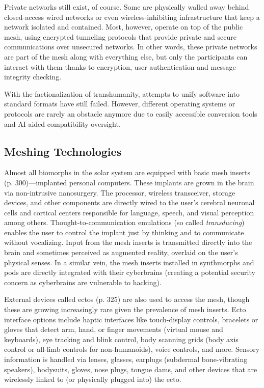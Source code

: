 Private networks still exist, of course. Some are 
physically walled away behind closed-access wired networks
or even wireless-inhibiting infrastructure that
keep a network isolated and contained. Most, however, 
operate on top of the public mesh, using encrypted 
tunneling protocols that provide private and secure 
communications over unsecured networks. In other 
words, these private networks are part of the mesh 
along with everything else, but only the participants 
can interact with them thanks to encryption, user authentication
and message integrity checking.

With the factionalization of transhumanity, attempts
to unify software into standard formats have
still failed. However, different operating systems 
or protocols are rarely an obstacle anymore due to 
easily accessible conversion tools and AI-aided compatibility
oversight.

\subsection{Meshing Technologies}

Almost all biomorphs in the solar system are equipped 
with basic mesh inserts (p. 300)—implanted personal 
computers. These implants are grown in the brain via 
non-intrusive nanosurgery. The processor, wireless 
transceiver, storage devices, and other components 
are directly wired to the user's cerebral neuronal cells 
and cortical centers responsible for language, speech, 
and visual perception among others. Thought-to-communication
emulations (so called \textit{transducing})
enables the user to control the implant just by thinking
and to communicate without vocalizing. Input
from the mesh inserts is transmitted directly into the 
brain and sometimes perceived as augmented reality, 
overlaid on the user's physical senses. In a similar 
vein, the mesh inserts installed in synthmorphs and 
pods are directly integrated with their cyberbrains 
(creating a potential security concern as cyberbrains 
are vulnerable to hacking).

External devices called ectos (p. 325) are also 
used to access the mesh, though these are growing 
increasingly rare given the prevalence of mesh inserts. 
Ecto interface options include haptic interfaces like 
touch-display controls, bracelets or gloves that detect 
arm, hand, or finger movements (virtual mouse and 
keyboards), eye tracking and blink control, body 
scanning grids (body axis control or all-limb controls 
for non-humanoids), voice controls, and more. Sensory
information is handled via lenses, glasses, earplugs
(subdermal bone-vibrating speakers), bodysuits,
gloves, nose plugs, tongue dams, and other devices 
that are wirelessly linked to (or physically plugged 
into) the ecto.

